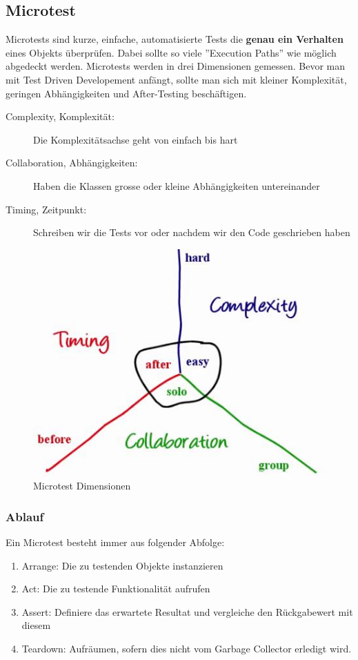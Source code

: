 \clearpage

\subsection{Microtest}
Microtests sind kurze, einfache, automatisierte Tests die \textbf{genau ein Verhalten} eines Objekts überprüfen. Dabei sollte so viele ''Execution Paths'' wie möglich abgedeckt werden. Microtests werden in drei Dimensionen gemessen. Bevor man mit Test Driven Developement anfängt, sollte man sich mit kleiner Komplexität, geringen Abhängigkeiten und After-Testing beschäftigen.
\begin{description}
	\item[Complexity, Komplexität:] Die Komplexitätsachse geht von einfach bis hart
	\item[Collaboration, Abhängigkeiten:] Haben die Klassen grosse oder kleine Abhängigkeiten untereinander
	\item[Timing, Zeitpunkt:] Schreiben wir die Tests vor oder nachdem wir den Code geschrieben haben
\end{description}

\begin{figure}[h]
\centering
\includegraphics[width=0.4\linewidth]{images/microtest}
\caption{Microtest Dimensionen}
\label{fig:microtest}
\end{figure}

\subsubsection{Ablauf}
Ein Microtest besteht immer aus folgender Abfolge:
\begin{enumerate}
	\item Arrange: Die zu testenden Objekte instanzieren
	\item Act: Die zu testende Funktionalität aufrufen
	\item Assert: Definiere das erwartete Resultat und vergleiche den Rückgabewert mit diesem
	\item Teardown: Aufräumen, sofern dies nicht vom Garbage Collector erledigt wird.
\end{enumerate}

